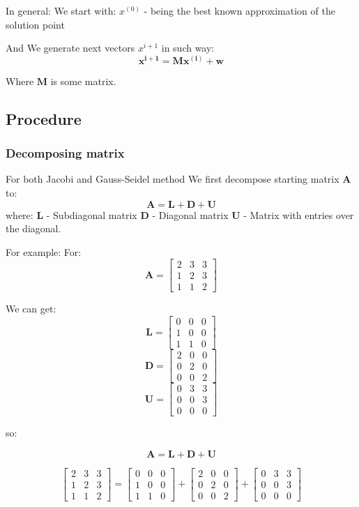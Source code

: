 \documentclass[12pt]{report}
\begin{document}
In general:
We start with:
 \textbf{$x^{(0)}$ } - being the best known approximation of the solution point

And We generate next vectors  \textbf{$x^{i+1}$}  in such way:
\[ \mathbf{x^{i+1}} = \mathbf{M}\mathbf{x^{(i)}} + \mathbf{w} \]

Where $\mathbf{M}$ is some matrix.

\subsection{Procedure}

\subsubsection{Decomposing matrix}
For both Jacobi and Gauss-Seidel method We first decompose starting matrix $ \mathbf{A} $ to:
\[ \mathbf{A} = \mathbf{L} + \mathbf{D} + \mathbf{U} \]
where:
$ \mathbf{L} $ - Subdiagonal matrix
$ \mathbf{D} $ - Diagonal matrix
$ \mathbf{U} $ - Matrix with entries over the diagonal.

For example:
For:
\[ \mathbf{A} = \begin{bmatrix}
2 & 3 & 3\\
1 & 2 & 3\\
1 & 1 & 2
\end{bmatrix}
\]

We can get:
\[ \mathbf{L} = \begin{bmatrix}
0 & 0 & 0\\
1 & 0 & 0\\
1 & 1 & 0
\end{bmatrix}
\]
\[ \mathbf{D} = \begin{bmatrix}
2 & 0 & 0\\
0 & 2 & 0\\
0 & 0 & 2
\end{bmatrix}
\]
\[ \mathbf{U} = \begin{bmatrix}
0 & 3 & 3\\
0 & 0 & 3\\
0 & 0 & 0
\end{bmatrix}
\]

so:

\[ \mathbf{A} = \mathbf{L} + \mathbf{D} + \mathbf{U} \]

\[
\begin{bmatrix}
2 & 3 & 3\\
1 & 2 & 3\\
1 & 1 & 2
\end{bmatrix}
=
\begin{bmatrix}
0 & 0 & 0\\
1 & 0 & 0\\
1 & 1 & 0
\end{bmatrix}
+
\begin{bmatrix}
2 & 0 & 0\\
0 & 2 & 0\\
0 & 0 & 2
\end{bmatrix}
+
\begin{bmatrix}
0 & 3 & 3\\
0 & 0 & 3\\
0 & 0 & 0
\end{bmatrix}
\]
\end{document}
